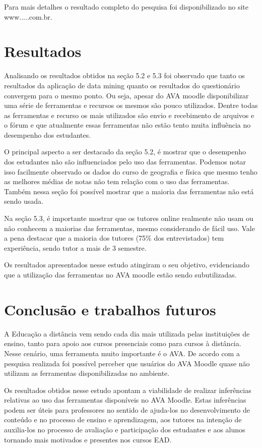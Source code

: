 \documentclass[12pt]{article}
\begin{document}
Para mais detalhes o resultado completo do pesquisa foi disponibilizado no site www.....com.br.
\section{Resultados}

Analisando os resultados obtidos na seção 5.2 e 5.3 foi observado que tanto os resultados da aplicação de data mining quanto os resultados do questionário convergem para o mesmo ponto. Ou seja, apesar do AVA moodle disponibilizar uma série de ferramentas e recursos os mesmos são pouco utilizados. Dentre todas as ferramentas e recurso os mais utilizados são envio e recebimento de arquivos e o fórum e que atualmente essas ferramentas não estão tento muita influência no desempenho dos estudantes. 

O principal aspecto a ser destacado da seção 5.2, é mostrar que o desempenho dos estudantes não são influenciados pelo uso das ferramentas.  Podemos notar isso facilmente observado os dados do curso de geografia e física que mesmo tenho as melhores médias de notas não tem relação com o uso das ferramentas. Também nessa seção foi possível mostrar que a maioria das ferramentas não está sendo usada. 

Na seção 5.3, é importante mostrar que os tutores online realmente não usam ou não conhecem a maiorias das ferramentas, mesmo considerando de fácil uso. Vale a pena destacar que a maioria dos tutores (75$\%$ dos entrevistados) tem experiência, sendo tutor a mais de 3 semestre.

Os resultados apresentados nesse estudo atingiram o seu objetivo, evidenciando que a utilização das ferramentas no AVA moodle estão sendo subutilizadas.

\section{Conclusão e trabalhos futuros} 

A Educação a distância vem sendo cada dia mais utilizada pelas instituições de ensino, tanto para apoio aos cursos presenciais como para cursos à distância. Nesse cenário, uma ferramenta muito importante é o AVA. De acordo com a pesquisa realizada foi possível perceber que usuários do AVA Moodle quase não utilizam as ferramentas disponibilizadas no ambiente.

Os resultados obtidos nesse estudo apontam a viabilidade de realizar inferências relativas ao uso das ferramentas disponíveis no AVA Moodle. Estas inferências podem ser úteis para professores no sentido de ajuda-los no desenvolvimento de conteúdo e no processo de ensino e aprendizagem, aos tutores na intenção de auxilia-los no processo de avaliação e participação dos estudantes e aos alunos tornando mais motivados e presentes nos cursos EAD.
\end{document}
